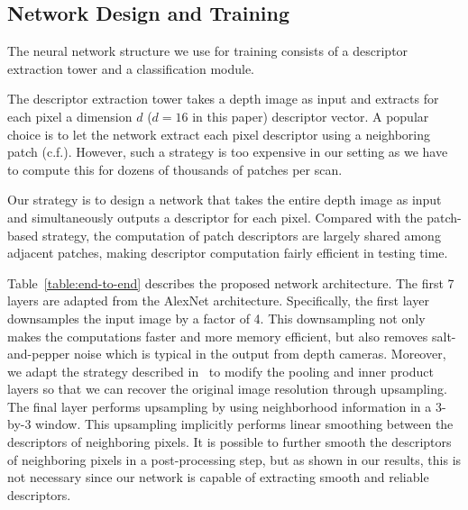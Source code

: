 \documentclass[10pt,twocolumn,letterpaper]{article}
\begin{document}
\subsection{Network Design and Training}

The neural network structure we use for training consists of a descriptor extraction tower and a classification module.

 The descriptor extraction tower takes a depth image as input and extracts for each pixel a dimension $d$ ($d=16$ in this paper) descriptor vector. A popular choice is to let the network extract each pixel descriptor using a neighboring patch (c.f.\cite{Han_2015_CVPR,DBLP:conf/cvpr/ZagoruykoK15}). However, such a strategy is too expensive in our setting as we have to compute this for dozens of thousands of patches per scan.

Our strategy is to design a network that takes the entire depth image as input and simultaneously outputs a descriptor for each pixel. Compared with the patch-based strategy, the computation of patch descriptors are largely shared among adjacent patches, making descriptor computation fairly efficient in testing time.

Table~\ref{table:end-to-end} describes the proposed network architecture. The first 7 layers are adapted from the AlexNet architecture.  Specifically, the first layer downsamples the input image by a factor of 4. This downsampling not only makes the computations faster and more memory efficient, but also removes salt-and-pepper noise which is typical in the output from depth cameras. Moreover, we adapt the strategy described in~\cite{SermanetEZMFL13} to modify the pooling and inner product layers so that we can recover the original image resolution through upsampling. The final layer performs upsampling by using neighborhood information in a 3-by-3 window. This upsampling implicitly performs linear smoothing between the descriptors of neighboring pixels. It is possible to further smooth the descriptors of neighboring pixels in a post-processing step, but as shown in our results, this is not necessary since our network is capable of extracting smooth and reliable descriptors.
\end{document}
